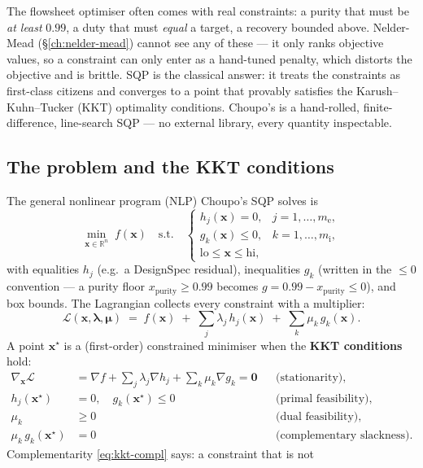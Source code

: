 \documentclass[11pt,a4paper]{article}
\newcommand{\R}{\mathbb{R}}
\newcommand{\xv}{\mathbf{x}}
\begin{document}
The flowsheet optimiser often comes with real constraints: a purity
that must be \emph{at least} $0.99$, a duty that must \emph{equal} a
target, a recovery bounded above. Nelder-Mead (§\ref{ch:nelder-mead})
cannot see any of these --- it only ranks objective values, so a
constraint can only enter as a hand-tuned penalty, which distorts the
objective and is brittle. SQP \cite{NocedalWright,Powell1978} is the
classical answer: it treats the constraints as first-class citizens
and converges to a point that provably satisfies the Karush--Kuhn--Tucker
(KKT) optimality conditions. Choupo's  is a
hand-rolled, finite-difference, line-search SQP --- no external library,
every quantity inspectable.

\subsection{The problem and the KKT conditions}

The general nonlinear program (NLP) Choupo's SQP solves is
\begin{equation}
   \min_{\xv \in \R^n} \; f(\xv)
   \quad \text{s.t.} \quad
   \begin{cases}
     h_j(\xv) = 0, & j = 1,\dots,m_{\mathrm e}, \\
     g_k(\xv) \le 0, & k = 1,\dots,m_{\mathrm i}, \\
     \mathrm{lo} \le \xv \le \mathrm{hi}, &
   \end{cases}
   \label{eq:sqp-nlp}
\end{equation}
with equalities $h_j$ (e.g.\ a DesignSpec residual), inequalities $g_k$
(written in the $\le 0$ convention --- a purity floor
$x_{\mathrm{purity}} \ge 0.99$ becomes $g = 0.99 - x_{\mathrm{purity}}
\le 0$), and box bounds. The Lagrangian collects every constraint with
a multiplier:
\begin{equation}
   \mathcal L(\xv, \boldsymbol\lambda, \boldsymbol\mu)
   \;=\; f(\xv)
   \;+\; \sum_{j} \lambda_j\, h_j(\xv)
   \;+\; \sum_{k} \mu_k\, g_k(\xv).
   \label{eq:sqp-lagrangian}
\end{equation}
A point $\xv^\star$ is a (first-order) constrained minimiser when the
\textbf{KKT conditions} hold:
\begin{align}
   \nabla_{\!\xv} \mathcal L
     &= \nabla f + \textstyle\sum_j \lambda_j \nabla h_j
        + \sum_k \mu_k \nabla g_k = \mathbf 0
     && \text{(stationarity)}, \label{eq:kkt-stat}\\
   h_j(\xv^\star) &= 0,\quad g_k(\xv^\star) \le 0
     && \text{(primal feasibility)}, \label{eq:kkt-feas}\\
   \mu_k &\ge 0
     && \text{(dual feasibility)}, \label{eq:kkt-dual}\\
   \mu_k\, g_k(\xv^\star) &= 0
     && \text{(complementary slackness)}. \label{eq:kkt-compl}
\end{align}
Complementarity \eqref{eq:kkt-compl} says: a constraint that is not
\end{document}
